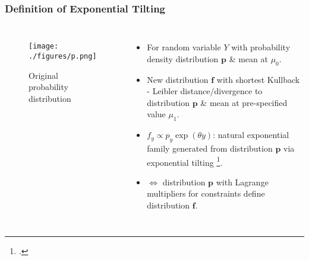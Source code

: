 \documentclass[hyperref={bookmarks=false},aspectratio=169]{beamer}
\begin{document}
\begin{frame}
\frametitle{Definition of Exponential Tilting}

\begin{columns}


\begin{figure}
    \centering
    \texttt{[image: ./figures/p.png]}
    \caption{Original probability distribution}
    \label{fig:OriginalPMF}
\end{figure}

\begin{itemize}
    \item For random variable $Y$ with probability density distribution $\boldsymbol{p}$ {\&} mean at $\mu_0$.
    \item New distribution $\boldsymbol{f}$ with shortest Kullback - Leibler distance/divergence to distribution $\boldsymbol{p}$ {\&} mean at pre-specified value $\mu_1$.
    \item $f_y \propto p_y  \exp (\theta y)$: natural exponential family generated from distribution $\boldsymbol{p}$ via exponential tilting \footcite{EETCarloCamarda}.
    \item $\Longleftrightarrow$ distribution $\boldsymbol{p}$ with Lagrange multipliers for constraints define distribution $\boldsymbol{f}$.
\end{itemize}

\end{columns}
\end{frame}
\end{document}
